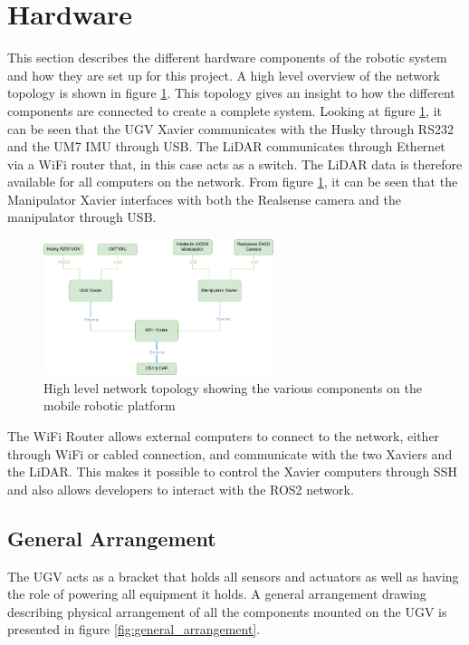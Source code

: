 \section{Hardware}
This section describes the different hardware components of the robotic system and how they are set up for this project. A high level overview of the network topology is shown in figure \ref{fig:topology}. This topology gives an insight to how the different components are connected to create a complete system. Looking at figure \ref{fig:topology}, it can be seen that the UGV Xavier communicates with the Husky through RS232 and the UM7 IMU through USB. The LiDAR communicates through Ethernet via a WiFi router that, in this case acts as a switch. The LiDAR data is therefore available for all computers on the network. From figure \ref{fig:topology}, it can be seen that the Manipulator Xavier interfaces with both the Realsense camera and the manipulator through USB. 

\begin{figure}[H]
  \centering
  \includegraphics[width = 0.6\textwidth]{Figures/example_figure.drawio.png}
  \caption{High level network topology showing the various components on the mobile robotic platform}
  \label{fig:topology}
\end{figure}

The WiFi Router allows external computers to connect to the network, either through WiFi or cabled connection, and communicate with the two Xaviers and the LiDAR. This makes it possible to control the Xavier computers through SSH and also allows developers to interact with the ROS2 network.

\subsection{General Arrangement}
The UGV acts as a bracket that holds all sensors and actuators as well as having the role of powering all equipment it holds. A general arrangement drawing describing physical arrangement of all the components mounted on the UGV is presented in figure \ref{fig:general_arrangement}.


